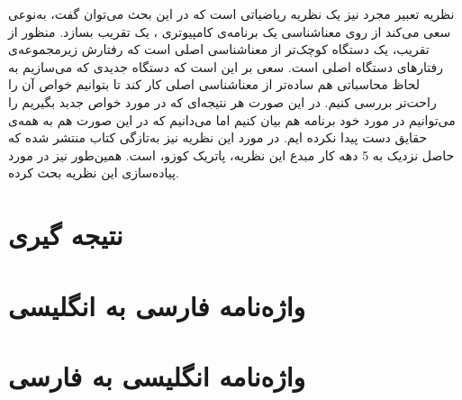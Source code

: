 \documentclass[12pt]{report}
\begin{document}
نظریه تعبیر مجرد\cite{cousot1} نیز یک نظریه ریاضیاتی است که در این بحث می‌توان گفت، به‌نوعی سعی می‌کند از روی معناشناسی یک برنامه‌ی کامپیوتری\cite{winskel} ، یک تقریب بسازد. منظور از تقریب، یک دستگاه کوچک‌تر از معناشناسی اصلی است که رفتارش زیرمجموعه‌ی رفتارهای دستگاه اصلی است. سعی بر این است که دستگاه جدیدی که می‌سازیم به لحاظ محاسباتی هم ساده‌تر از معناشناسی اصلی کار کند تا بتوانیم خواص آن را راحت‌تر بررسی کنیم. در این صورت هر نتیجه‌ای که در مورد خواص جدید بگیریم را می‌توانیم در مورد خود برنامه هم بیان کنیم اما می‌دانیم که در این صورت هم به همه‌ی حقایق دست پیدا نکرده ایم. در مورد این نظریه نیز به‌تازگی کتاب\cite{cousotbook} منتشر شده که حاصل نزدیک به 5 دهه کار مبدع این نظریه، پاتریک کوزو، است. همین‌طور\cite{statica} نیز در مورد پیاده‌سازی این نظریه بحث کرده.



\tableofcontents








\chapter{نتیجه گیری}

\chapter*{واژه‌نامه فارسی به انگلیسی}
\chapter*{ واژه‌نامه انگلیسی به فارسی}

\newpage
\begin{latin}
	
	
\end{latin}
\end{document}
